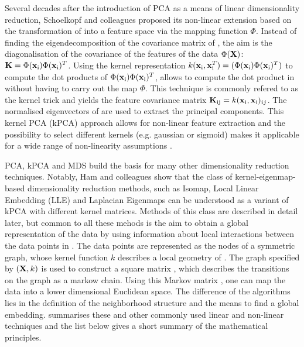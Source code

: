 Several decades after the introduction of PCA as a means of linear dimensionality reduction, Schoelkopf and colleagues proposed its non-linear extension based on the transformation of  into a feature space  via the mapping function  \(\Phi\). Instead of finding the eigendecomposition of the covariance matrix of , the aim is the diagonalisation of the covariance  of the features of the data \(\Phi(\boldsymbol{\mathbf{X}})\): \(\boldsymbol{\mathbf{K}} = \Phi(\boldsymbol{\mathbf{x}}_\text{i})\Phi(\boldsymbol{\mathbf{x}}_\text{i})^T\). Using the kernel representation \(k(\boldsymbol{\mathbf{x}}_\text{i}, \boldsymbol{\mathbf{x}}_\text{i}^T) = (\Phi(\boldsymbol{\mathbf{x}}_\text{i})\Phi(\boldsymbol{\mathbf{x}}_\text{i})^T)\) to compute the dot products of \(\Phi(\boldsymbol{\mathbf{x}}_\text{i})\Phi(\boldsymbol{\mathbf{x}}_\text{i})^T\), allows to compute the dot product in  without having to carry out the map \(\Phi\). This technique is commonly refered to as the kernel trick and yields the feature covariance matrix \(\boldsymbol{\mathbf{K}}_\text{ij} = k(\boldsymbol{\mathbf{x}}_\text{i}, \boldsymbol{\mathbf{x}}_\text{i})_{ij}\). The normalised eigenvectors of  are used to extract the principal components. This kernel PCA (kPCA) approach allows for non-linear feature extraction and the possibility to select different kernels (e.g. gaussian or sigmoid) makes it applicable for a wide range of non-linearity assumptions \citep{Schoelkopf1998}.

PCA, kPCA and MDS build the basis for many other dimensionality reduction techniques. Notably, Ham and colleagues show that the class of kernel-eigenmap-based dimensionality reduction methods, such as Isomap, Local Linear Embedding (LLE) and Laplacian Eigenmaps can be understood as a variant of kPCA with different kernel matrices. Methods of this class are described in detail later, but common to all these mehods is the aim to obtain a global representation of the data  by using information about local interactions between the data points in . The data points are represented as the nodes of a symmetric graph, whose kernel function \(k\) describes a local geometry of . The graph specified by \((\boldsymbol{\mathbf{X}}, k)\) is used to construct a square matrix , which describes the transitions on the graph as a markow chain. Using this Markov matrix , one can map the data into a lower dimensional Euclidean space. The difference of the algorithms lies in the definition of the neighborhood structure and the means to find a global embedding.  summarises these and other commonly used linear and non-linear techniques and the list below gives a short summary of the mathematical principles. 

